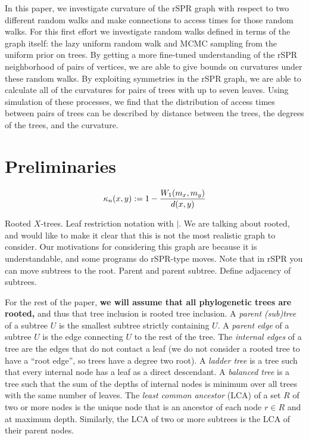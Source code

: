 \documentclass{amsart}
\newcommand{\curvature}[2][]{%
    \ifthenelse{\equal{#1}{}}%
		{\kappa_n(#2)}%
		{\kappa_n(#1;#2)}%
}
\begin{document}
In this paper, we investigate curvature of the rSPR graph with respect to two different random walks and make connections to access times for those random walks.
For this first effort we investigate random walks defined in terms of the graph itself: the lazy uniform random walk and MCMC sampling from the uniform prior on trees.
By getting a more fine-tuned understanding of the rSPR neighborhood of pairs of vertices, we are able to give bounds on curvatures under these random walks.
By exploiting symmetries in the rSPR graph, we are able to calculate all of the curvatures for pairs of trees with up to seven leaves.
Using simulation of these processes, we find that the distribution of access times between pairs of trees can be described by distance between the trees, the degrees of the trees, and the curvature.


\section{Preliminaries}
\begin{equation}
\curvature{x, y} := 1 - \frac{W_1(m_x, m_y)}{d(x, y)}
\label{eq:curvatureDef}
\end{equation}

Rooted $X$-trees.
Leaf restriction notation with $|$.
We are talking about rooted, and would like to make it clear that this is not the most realistic graph to consider.
Our motivations for considering this graph are because it is understandable, and some programs do rSPR-type moves.
Note that in rSPR you can move subtrees to the root.
Parent and parent subtree.
Define adjacency of subtrees.

For the rest of the paper, \textbf{we will assume that all phylogenetic trees are rooted,} and thus that tree inclusion is rooted tree inclusion.
A \emph{parent (sub)tree} of a subtree $U$ is the smallest subtree strictly containing $U$.
A \emph{parent edge} of a subtree $U$ is the edge connecting $U$ to the rest of the tree.
The \emph{internal edges} of a tree are the edges that do not contact a leaf (we do not consider a rooted tree to have a ``root edge'', so trees have a degree two root).
A \emph{ladder tree} is a tree such that every internal node has a leaf as a direct descendant.
A \emph{balanced tree} is a tree such that the sum of the depths of internal nodes is minimum over all trees with the same number of leaves.
The \emph{least common ancestor} (LCA) of a set $R$ of two or more nodes is the unique node that is an ancestor of each node $r \in R$ and at maximum depth.
Similarly, the LCA of two or more subtrees is the LCA of their parent nodes.
\end{document}
